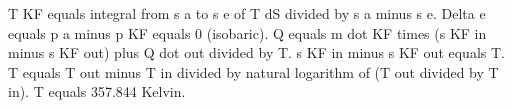 T KF equals integral from s a to s e of T dS divided by s a minus s e.  
Delta e equals p a minus p KF equals 0 (isobaric).  
Q equals m dot KF times (s KF in minus s KF out) plus Q dot out divided by T.  
s KF in minus s KF out equals T.  
T equals T out minus T in divided by natural logarithm of (T out divided by T in).  
T equals 357.844 Kelvin.